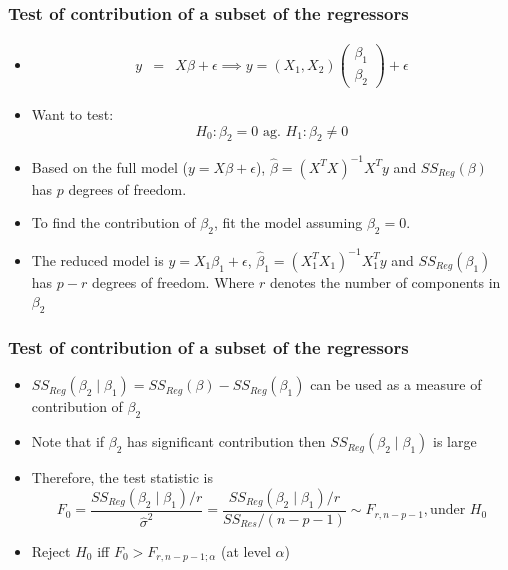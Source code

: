 \documentclass[10pt]{beamer} %
\begin{document}
\begin{frame}
	\frametitle{Test of contribution of a subset of the regressors}
	\begin{itemize}
		\item \begin{eqnarray}
      y &=& X \beta + \epsilon \implies y = (X_1, X_2) \begin{pmatrix} \beta_1
      \\ \beta_2 \end{pmatrix} + \epsilon \nonumber 
		\end{eqnarray}
   \item Want to test:
		$$H_0: {\beta_2} = 0 \mbox{ ag. } H_1: {\beta_2} \neq 0 $$
   \item Based on the full model (${y} =
      {X} {\beta} + {\epsilon}$),
      ${\hat\beta} = (X^TX)^{-1}X^Ty$ and
      $SS_{Reg}({\beta})$ has $p$ degrees of freedom. 
		\vspace{0.2cm}
      \item To find the contribution of ${\beta_2}$, fit the model
         assuming ${\beta_2} = 0$. 
         \vspace{0.2cm}		
      \item The reduced model is ${y} =
         {X_1} {\beta_1} + {\epsilon}$,
         ${\hat\beta_1} = (X_1^TX_1)^{-1}X_1^Ty$ and
         $SS_{Reg}({\beta_1})$ has $ p-r$ degrees of freedom. Where
         $r$ denotes the number of components in ${\beta_2}$
	\end{itemize}	
\end{frame}

\begin{frame}
	\frametitle{Test of contribution of a subset of the regressors}
	\begin{itemize}
      \item $SS_{Reg}({\beta_2} \mid {\beta_1}) =
         SS_{Reg}({\beta}) - SS_{Reg}({\beta_1})$ can be
         used as a measure of contribution of ${\beta_2}$
         \vspace{0.5cm}
      \item Note that if ${\beta_2}$ has significant contribution
         then $SS_{Reg}({\beta_2} \mid {\beta_1})$ is large
         \vspace{0.5cm}		
      \item Therefore, the test statistic is 
         $$ F_0 = \frac{SS_{Reg}({\beta_2} \mid {\beta_1})/r}{\hat\sigma^2} =
         \frac{SS_{Reg}({\beta_2} \mid {\beta_1})/r}{SS_{Res}/(n-p-1)} \sim F_{r, n-p-1}, \mbox{
         under } H_0$$
      \item Reject $H_0$ iff $F_0 >  F_{r, n-p-1; \alpha}$ (at level $\alpha$)
   \end{itemize}	
\end{frame}
\end{document}
